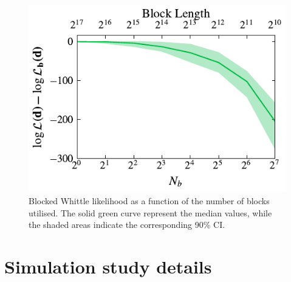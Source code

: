 \documentclass[%
 reprint,
 amsmath,amssymb,
 aps,
 nofootinbib,
]{revtex4-2}
\begin{document}
\begin{figure}[h]
  \includegraphics[width=\columnwidth]{lnl_vs_nchunks}
  \caption{Blocked Whittle likelihood as a function of the number of blocks utilised. The solid green curve represent the median values, while the shaded areas indicate the corresponding 90\% CI.}
  \label{fig:lnl_vs_nchunks}
\end{figure}








\section{Simulation study details}
\end{document}
